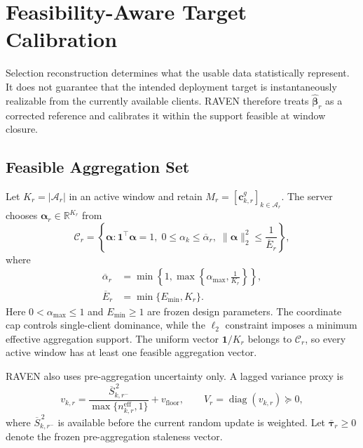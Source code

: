 \documentclass[letterpaper,journal]{IEEEtran}
\begin{document}
\section{Feasibility-Aware Target Calibration}
\label{sec:calibration}

Selection reconstruction determines what the usable data statistically
represent.  It does not guarantee that the intended deployment target is
instantaneously realizable from the currently available clients.  RAVEN
therefore treats $\widehat{\boldsymbol\beta}_r$ as a corrected reference and
calibrates it within the support feasible at window closure.

\subsection{Feasible Aggregation Set}
\label{subsec:feasible_set}

Let $K_r=|\mathcal{A}_r|$ in an active window and retain
$M_r=[\mathbf{c}^{g}_{k,r}]_{k\in\mathcal{A}_r}$.  The server chooses
$\boldsymbol\alpha_r\in\mathbb{R}^{K_r}$ from
\begin{equation}
 \mathcal{C}_r
 =
 \left\{
 \boldsymbol\alpha:
 \mathbf{1}^{\top}\boldsymbol\alpha=1,\;
 0\le\alpha_k\le\overline\alpha_r,\;
 \|\boldsymbol\alpha\|_2^2\le\frac{1}{\overline E_r}
 \right\},
 \label{eq:Cr}
\end{equation}
where
\begin{equation}
\begin{aligned}
 \overline\alpha_r
 &=
 \min\!\left\{
 1,
 \max\!\left\{
 \alpha_{\max},
 \frac{1}{K_r}
 \right\}
 \right\},\\
 \overline E_r
 &=
 \min\{E_{\min},K_r\}.
\end{aligned}
 \label{eq:cap_ess}
\end{equation}
Here $0<\alpha_{\max}\le1$ and $E_{\min}\ge1$ are frozen design parameters.
The coordinate cap controls single-client dominance, while the
$\ell_2$ constraint imposes a minimum effective aggregation support.  The
uniform vector $\mathbf{1}/K_r$ belongs to $\mathcal{C}_r$, so every active
window has at least one feasible aggregation vector.

RAVEN also uses pre-aggregation uncertainty only.  A lagged variance proxy is
\begin{equation}
 v_{k,r}
 =
 \frac{
 \overline S_{k,r^-}^{\,2}
 }{
 \max\{n^{\mathrm{eff}}_{k,r},1\}
 }
 +
 v_{\mathrm{floor}},
 \qquad
 V_r=\operatorname{diag}(v_{k,r})\succeq0,
 \label{eq:variance_proxy}
\end{equation}
where $\overline S_{k,r^-}^{\,2}$ is available before the current random update
is weighted.  Let $\overline{\boldsymbol\tau}_r\ge0$ denote the frozen
pre-aggregation staleness vector.
\end{document}
